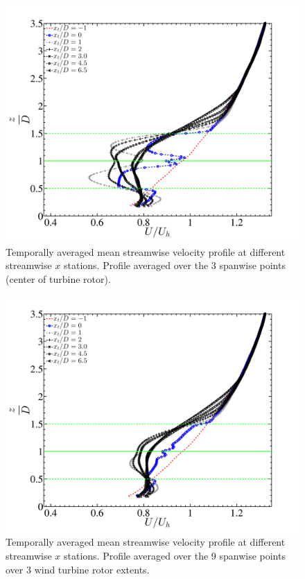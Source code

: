 \begin{figure}
\centering
\includegraphics[width = 0.8\linewidth]{stats/velprof_3points_avg.pdf}
\caption[Mean streamwise velocity at $x$ stations 1]{Temporally averaged mean streamwise velocity profile at different streamwise $x$ stations. Profile averaged over the  3 spanwise points (center of turbine rotor).}\label{fig:meanstat1}
\end{figure}
\begin{figure}
\centering
\includegraphics[width = 0.8\linewidth]{stats/velprof_9points_avg.pdf}
\caption[Mean streamwise velocity at $x$ stations 2]{Temporally averaged mean streamwise velocity profile at different streamwise $x$ stations. Profile averaged over the  9 spanwise points over 3 wind turbine rotor extents.}\label{fig:meanstat2}
\end{figure}
